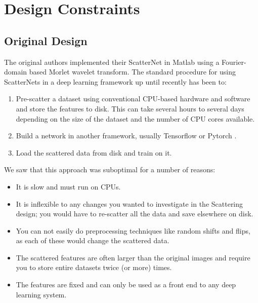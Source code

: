 \section{Design Constraints}
\subsection{Original Design}
The original authors implemented their ScatterNet in Matlab \cite{oyallon_deep_2015} using
a Fourier-domain based Morlet wavelet transform.
The standard procedure for using ScatterNets in a deep learning
framework up until recently has been to:
\begin{enumerate}
  \item Pre-scatter a dataset using conventional CPU-based hardware and software
    and store the features to disk. This can take several hours to several days
    depending on the size of the dataset and the number of CPU cores available.
  \item Build a network in another framework, usually Tensorflow \cite{abadi_tensorflow:_2015}
    or Pytorch \cite{paszke_automatic_2017}.
  \item Load the scattered data from disk and train on it.
\end{enumerate}
We saw that this approach was suboptimal for a number of reasons:
\begin{itemize}
  \item It is slow and must run on CPUs.
  \item It is inflexible to any changes you wanted to investigate in the
    Scattering design; you would have to re-scatter all the data and save
    elsewhere on disk.
  \item You can not easily do preprocessing techniques like random shifts and
    flips, as each of these would change the scattered data.
  \item The scattered features are often larger than the original images and
    require you to store entire datasets twice (or more) times.
  \item The features are fixed and can only be used as a front end to any
    deep learning system.
\end{itemize}


